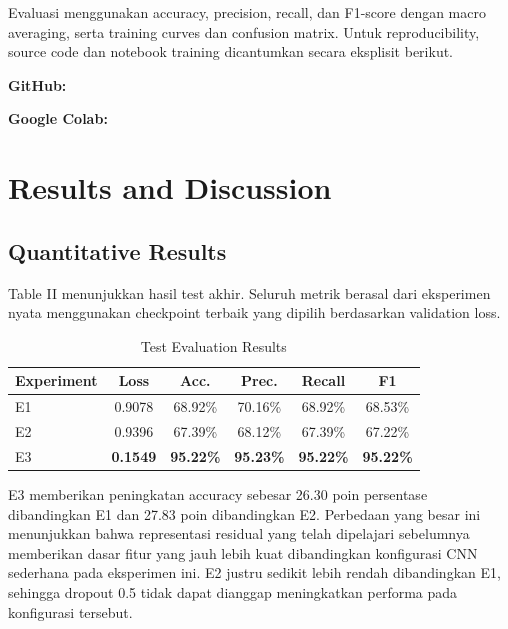\documentclass[conference,a4paper]{IEEEtran}
\begin{document}
Evaluasi menggunakan accuracy, precision, recall, dan F1-score dengan macro averaging, serta training curves dan confusion matrix. Untuk reproducibility, source code dan notebook training dicantumkan secara eksplisit berikut.\par\smallskip\noindent\textbf{GitHub:}\par\noindent{}\par\noindent\textbf{Google Colab:}\par\noindent{}

\section{Results and Discussion}
\subsection{Quantitative Results}
Table II menunjukkan hasil test akhir. Seluruh metrik berasal dari eksperimen nyata menggunakan checkpoint terbaik yang dipilih berdasarkan validation loss.

\begin{table}[htbp]
\caption{Test Evaluation Results}
\centering
\begin{tabular}{lccccc}
\toprule
Experiment & Loss & Acc. & Prec. & Recall & F1 \\
\midrule
E1 & 0.9078 & 68.92\% & 70.16\% & 68.92\% & 68.53\% \\
E2 & 0.9396 & 67.39\% & 68.12\% & 67.39\% & 67.22\% \\
E3 & \textbf{0.1549} & \textbf{95.22\%} & \textbf{95.23\%} & \textbf{95.22\%} & \textbf{95.22\%} \\
\bottomrule
\end{tabular}
\label{tab:results}
\end{table}

E3 memberikan peningkatan accuracy sebesar 26.30 poin persentase dibandingkan E1 dan 27.83 poin dibandingkan E2. Perbedaan yang besar ini menunjukkan bahwa representasi residual yang telah dipelajari sebelumnya memberikan dasar fitur yang jauh lebih kuat dibandingkan konfigurasi CNN sederhana pada eksperimen ini. E2 justru sedikit lebih rendah dibandingkan E1, sehingga dropout 0.5 tidak dapat dianggap meningkatkan performa pada konfigurasi tersebut.
\end{document}
